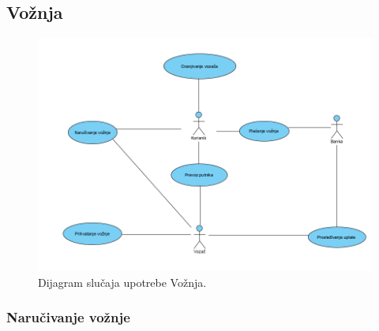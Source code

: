 \subsection{\bfseries Vožnja}
\begin{figure}[H]
\begin{center}
\includegraphics[width=\textwidth]{Slike/VoznjaUseCase.png}
\end{center}
    \caption{Dijagram slučaja upotrebe Vožnja.}
\label{fig:Vožnja}
\end{figure}


\subsubsection{\bfseries Naručivanje vožnje}

